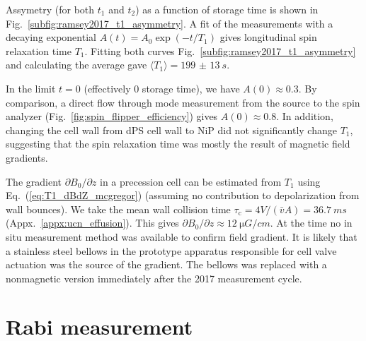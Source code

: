 Assymetry (for both $t_1$ and $t_2$) as a function of storage time is shown in Fig.~\ref{subfig:ramsey2017_t1_asymmetry}. A fit of the measurements with a decaying exponential $A(t)=A_0\exp(-t/T_1)$ gives longitudinal spin relaxation time $T_1$. Fitting both curves Fig.~\ref{subfig:ramsey2017_t1_asymmetry} and calculating the average gave $\langle T_1 \rangle=\qty{199(13)}{s}$. 

In the limit $t=0$ (effectively 0 storage time), we have $A(0)\approx 0.3$. By comparison, a direct flow through mode measurement from the \ucn source to the spin analyzer (Fig.~\ref{fig:spin_flipper_efficiency}) gives $A(0)\approx 0.8$. In addition, changing the cell wall from dPS cell wall to NiP did not significantly change $T_1$, suggesting that the spin relaxation time was mostly the result of magnetic field gradients.

The gradient $\partial B_0 / \partial z$ in a precession cell can be estimated from $T_1$ using Eq.~(\ref{eq:T1_dBdZ_mcgregor}) (assuming no contribution to depolarization from wall bounces). We take the mean wall collision time $\tau_\text{c}=4V/(\bar{v}A)=\qty{36.7}{ms}$ (Appx.~\ref{appx:ucn_effusion}). This gives $\partial B_0/\partial z\approx \qty{12}{\micro G\per cm}$. At the time no in situ measurement method was available to confirm field gradient. It is likely that a stainless steel bellows in the prototype apparatus responsible for cell valve actuation was the source of the gradient. The bellows was replaced with a nonmagnetic version immediately after the 2017 measurement cycle.


\section{Rabi measurement}\label{sec:2017_rabi_measurement}


